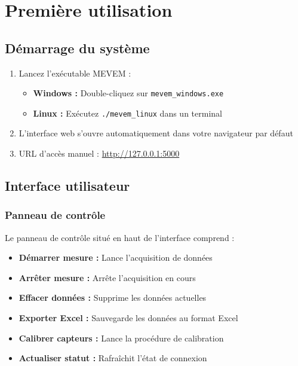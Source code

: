 \documentclass[12pt,a4paper]{article}
\begin{document}
\section{Première utilisation}

\subsection{Démarrage du système}

\begin{enumerate}
    \item Lancez l'exécutable MEVEM :
    \begin{itemize}
        \item \textbf{Windows :} Double-cliquez sur \texttt{mevem\_windows.exe}
        \item \textbf{Linux :} Exécutez \texttt{./mevem\_linux} dans un terminal
    \end{itemize}
    
    \item L'interface web s'ouvre automatiquement dans votre navigateur par défaut
    \item URL d'accès manuel : \url{http://127.0.0.1:5000}
\end{enumerate}

\subsection{Interface utilisateur}

\subsubsection{Panneau de contrôle}

Le panneau de contrôle situé en haut de l'interface comprend :

\begin{itemize}
    \item \textbf{Démarrer mesure :} Lance l'acquisition de données
    \item \textbf{Arrêter mesure :} Arrête l'acquisition en cours
    \item \textbf{Effacer données :} Supprime les données actuelles
    \item \textbf{Exporter Excel :} Sauvegarde les données au format Excel
    \item \textbf{Calibrer capteurs :} Lance la procédure de calibration
    \item \textbf{Actualiser statut :} Rafraîchit l'état de connexion
\end{itemize}
\end{document}
